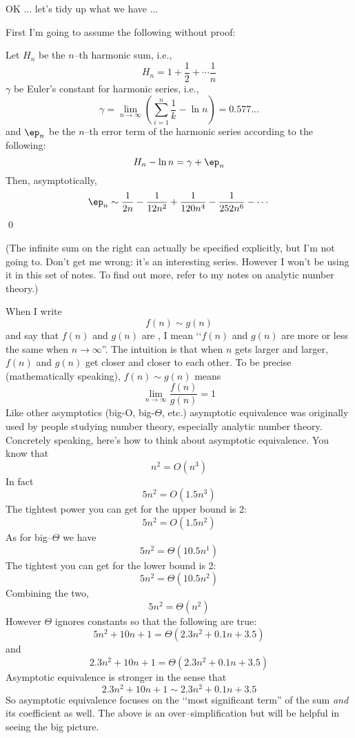 OK ... let's tidy up what we have ...

\newpage

First I'm going to assume the following without proof:

\begin{thm}
Let $H_n$ be the $n$--th harmonic sum, i.e.,
\[
H_n = 1 + \frac{1}{2} + \cdots \frac{1}{n}
\]
$\gamma$ be Euler's
constant for harmonic series, i.e.,
\[
\gamma = \lim_{n \rightarrow \infty} \left( \sum_{i=1}^n \frac{1}{k} - \ln n \right)
= 0.577...
\]
and $\ep_n$ be the $n$--th error term
of the harmonic series according to the following:
\[
H_n - \ln n = \gamma + \ep_n
\]
Then, asymptotically,
\[
\ep_n \sim \frac{1}{2n} - \frac{1}{12n^2} + \frac{1}{120 n^4} - \frac{1}{252 n^6} - \cdots
\]
\qed
\end{thm}

(The infinite sum on the right can actually be specified explicitly, but I'm not
going to. 
Don't get me wrong: it's an interesting series.
However I won't be using it in this set of notes.
To find out more, refer to my notes on analytic number theory.)

When I write
\[
f(n) \sim g(n)
\]
and say that $f(n)$ and $g(n)$ are ,
I mean \lq\lq $f(n)$ and $g(n)$ are more or less the same when $n \rightarrow \infty$''.
The intuition is that when $n$ gets larger and larger, $f(n)$ and $g(n)$ get closer
and closer to each other.
To be precise (mathematically speaking), $f(n) \sim g(n)$ means
\[
\lim_{n \rightarrow \infty} \frac{f(n)}{g(n)} = 1
\]
Like other asymptotics (big-O, big-$\Theta$, etc.) asymptotic equivalence
was originally used by people studying number theory, especially analytic number theory.
Concretely speaking, here's how to think about asymptotic equivalence.
You know that
\[
n^2 = O(n^3)
\]
In fact
\[
5n^2 = O(1.5n^3)
\]
The tightest power you can get for the upper bound is 2:
\[
5n^2 = O(1.5n^2)
\]
As for big--$\Theta$ we have
\[
5n^2 = \Theta(10.5 n^1)
\]
The tightest you can get for the lower bound is 2:
\[
5n^2 = \Theta(10.5 n^2)
\]
Combining the two,
\[
5n^2 = \Theta(n^2)
\]
However $\Theta$ ignores constants so that the following are true:
\[
5 n^2 + 10n + 1= \Theta(2.3 n^2 + 0.1 n + 3.5)
\]
and
\[
2.3 n^2 + 10n + 1 = \Theta(2.3 n^2 + 0.1 n + 3.5)
\]
Asymptotic equivalence is stronger in the sense that
\[
2.3 n^2 + 10n + 1 \sim 2.3 n^2 + 0.1 n + 3.5
\]
So asymptotic equivalence focuses on the \lq\lq most significant term'' of the sum
\textit{and} its coefficient as well.
The above is an over--simplification but will be helpful in seeing the big picture.

